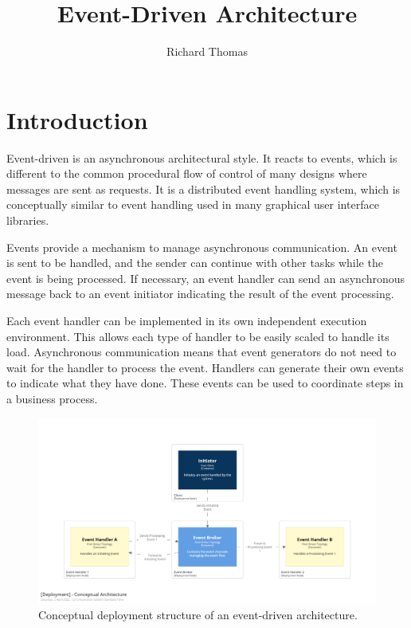 \title{Event-Driven Architecture}
\author{Richard Thomas}
\date{}

\maketitle

\section{Introduction}\label{sec:intro}

Event-driven is an asynchronous architectural style.
It reacts to events, which is different to the common procedural flow of control of many designs where messages are sent as requests.
It is a distributed event handling system, which is conceptually similar to event handling used in many graphical user interface libraries.

Events provide a mechanism to manage asynchronous communication.
An event is sent to be handled, and the sender can continue with other tasks while the event is being processed.
If necessary, an event handler can send an asynchronous message back to an event initiator indicating the result of the event processing.

Each event handler can be implemented in its own independent execution environment.
This allows each type of handler to be easily scaled to handle its load.
Asynchronous communication means that event generators do not need to wait for the handler to process the event.
Handlers can generate their own events to indicate what they have done.
These events can be used to coordinate steps in a business process.

\begin{figure}[h!]
    \begin{adjustwidth}{-10mm}{-10mm}
        \centering
        \includegraphics[trim=195 195 195 195,clip,width=0.95\paperwidth]{diagrams/conceptual-architecture.png}
    \end{adjustwidth}
    \caption{Conceptual deployment structure of an event-driven architecture.}
    \label{fig:conceptual-architecture}
\end{figure}

